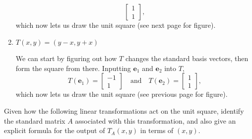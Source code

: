 \documentclass{article}
\begin{document}
\begin{enumerate}
\begin{solution}
\[\begin{bmatrix}
                1\\1
            \end{bmatrix},
        \]which now lets us draw the unit square (see next page for figure). 
    \end{solution}
    \pagebreak
    \item \(T(x,y) = (y-x,y+x)\)\begin{solution}
        We can start by figuring out how \(T\) changes the standard basis vectors, then form the square from there. Inputting \(\mathbf{e}_1\) and \(\mathbf{e}_2\) into \(T\),\[
            T(\mathbf{e}_1) = \begin{bmatrix}
                -1\\1
            \end{bmatrix} \quad \text{and} \quad T(\mathbf{e}_2) = \begin{bmatrix}
                1\\1
            \end{bmatrix},
        \]which now lets us draw the unit square (see previous page for figure). 
    \end{solution}
\end{enumerate}
\begin{center}
    \colorbox{CornflowerBlue!50}{
    \begin{minipage}[c]{0.9\textwidth}
        \centering
        Given how the following linear transformations act on the unit square, identify the standard matrix \(A\) associated with this transformation, and also give an explicit formula
        for the output of \(T_A(x,y)\) in terms of \((x,y)\). 
    \end{minipage}
    }
\end{center}
\end{document}
